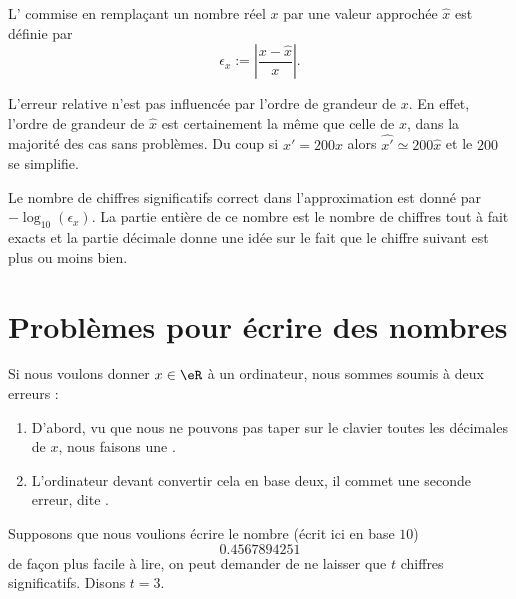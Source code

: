 \begin{definition}
	L' commise en remplaçant un nombre réel $x$ par une valeur approchée $\hat{x}$ est définie par
	\begin{equation}
		\epsilon_x:=\left|\frac{x-\hat{x}}{x}\right|.
	\end{equation}
\end{definition}

L'erreur relative n'est pas influencée par l'ordre de grandeur de \( x\). En effet, l'ordre de grandeur de \( \hat x\) est certainement la même que celle de \( x\), dans la majorité des cas sans problèmes. Du coup si \( x'=200x\) alors \( \hat{x'}\simeq 200\hat{x}\) et le \( 200\) se simplifie.

Le nombre de chiffres significatifs correct dans l'approximation est donné par \( -\log_{10}(\epsilon_x)\). La partie entière de ce nombre est le nombre de chiffres tout à fait exacts et la partie décimale donne une idée sur le fait que le chiffre suivant est plus ou moins bien.

\section{Problèmes pour écrire des nombres}

\begin{remark}
	Si nous voulons donner \( x\in \eR\) à un ordinateur, nous sommes soumis à deux erreurs :
	\begin{enumerate}
		\item
			D'abord, vu que nous ne pouvons pas taper sur le clavier toutes les décimales de \( x\), nous faisons une .
		\item
			L'ordinateur devant convertir cela en base deux, il commet une seconde erreur, dite .
	\end{enumerate}
\end{remark}

Supposons que nous voulions écrire le nombre (écrit ici en base \( 10\))
\begin{equation}
	0.4567894251
\end{equation}
de façon plus facile à lire, on peut demander de ne laisser que \( t\) chiffres significatifs. Disons \( t=3\).

